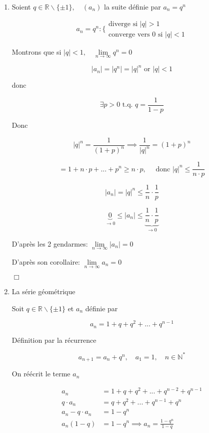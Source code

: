 \documentclass[
    11pt,
    a4paper,
    oneside,
    headinlcude, footinclude,
    twoside,
]{report}
\newcommand{\tq}[0]{\textrm{ t.q. }}
\newcommand{\cqfd}[0]{\begin{flushright}$\Box$\end{flushright}}
\begin{document}
\begin{enumerate}
\item Soient $q \in \mathbb{R} \backslash \{\pm1\}, \quad(a_{n})$ la suite
définie par $a_{n} = q^{n}$

$$a_{n} = q^{n}: \Big\{\begin{smallmatrix} \textrm{diverge si } | q |
> 1\\ \textrm{converge vers } 0 \textrm{ si } | q | < 1
\end{smallmatrix}$$

Montrons que si $| q | < 1, \quad \lim\limits_{n \to \infty} q^{n} =
0$

$$ | a _{n} | = | q^{n} | = | q |^{n} \textrm{ or } | q | < 1$$ 

donc

$$\exists p > 0 \tq q = \frac{1}{1-p}$$

Donc

$$ | q | ^{n} = \frac{1}{(1+p)^{n}} \implies \frac{1}{| q |^{n}} =
(1+p)^{n}$$

$$ = 1 + n \cdot p + ... + p^{n} \geq n \cdot p, \quad \textrm{ donc }
| q | ^{n} \leq \frac{1}{n \cdot p} $$

$$| a _{n} | = | q | ^{n} \leq \frac{1}{n} \cdot \frac{1}{p}$$

$$ \underbrace{0}_{\to 0} \leq | a_{n} | \leq  \underbrace{\frac{1}{n}
\cdot \frac{1}{p}}_{\to 0}$$


D'après les 2 gendarmes: $\lim\limits_{n \to \infty} | a_{n} | = 0$

D'après son corollaire: $\lim\limits_{n \to \infty} a_{n} = 0$

\cqfd

\item La série géométrique

Soit $q \in \mathbb{R} \backslash \{\pm1\}$ et $a_{n}$ définie par 

$$a_{n} = 1 + q + q^{2} + ... + q^{n-1}$$

Définition par la récurrence

$$a_{n+1} = a_{n}+q^{n}, \quad a_{1} = 1, \quad n \in \mathbb{N}^{*}$$

On réécrit le terme $a_{n}$

\[
\begin{split}
a_{n} &= 1 + q + q^{2} + ... + q^{n-2} + q^{n-1}\\
q\cdot a_{n} &=  q + q^{2} + ... + q^{n-1} + q^{n}\\
a_{n} - q \cdot a_{n} &= 1 - q^{n}\\
a_{n} (1 - q) &= 1 - q^{n}
\implies a_{n} = \frac{1-q^{n}}{1-q}
\end{split}
\]


\end{enumerate}
\end{document}
